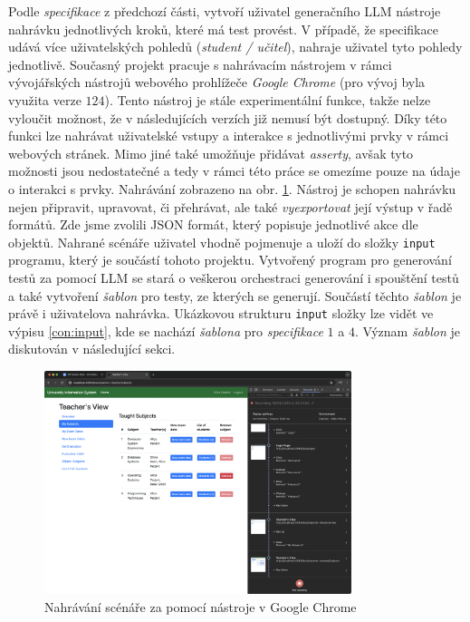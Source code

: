 \documentclass[czech, ma, kiv, he, iso690numb, pdf, viewonly]{fasthesis}
\begin{document}
    Podle \emph{specifikace} z předchozí části, vytvoří uživatel generačního LLM nástroje nahrávku jednotlivých kroků, které má test provést. V případě, že specifikace udává více uživatelských pohledů (\textit{student / učitel}), nahraje uživatel tyto pohledy jednotlivě. Současný projekt pracuje s nahrávacím nástrojem v rámci vývojářských nástrojů webového prohlížeče \textit{Google Chrome} (pro vývoj byla využita verze \(124\)). Tento nástroj je stále experimentální funkce, takže nelze vyloučit možnost, že v následujících verzích již nemusí být dostupný. Díky této funkci lze nahrávat uživatelské vstupy a interakce s jednotlivými prvky v rámci webových stránek. Mimo jiné také umožňuje přidávat \textit{asserty}, avšak tyto možnosti jsou nedostatečné a tedy v rámci této práce se omezíme pouze na údaje o interakci s prvky. Nahrávání zobrazeno na obr. \ref{fig:chrome_recording}. Nástroj je schopen nahrávku nejen připravit, upravovat, či přehrávat, ale také \emph{vyexportovat} její výstup v řadě formátů. Zde jsme zvolili JSON formát, který popisuje jednotlivé akce dle objektů. Nahrané scénáře uživatel vhodně pojmenuje a uloží do složky \verb|input| programu, který je součástí tohoto projektu. Vytvořený program pro generování testů za pomocí LLM se stará o veškerou orchestraci generování i spouštění testů a také vytvoření \emph{šablon} pro testy, ze kterých se generují. Součástí těchto \emph{šablon} je právě i uživatelova nahrávka. Ukázkovou strukturu \verb|input| složky lze vidět ve výpisu \ref{con:input}, kde se nachází \emph{šablona} pro \textit{specifikace} \(1\) a \(4\). Význam \emph{šablon} je diskutován v následující sekci.

    \begin{figure}
        \includegraphics[width=0.8\textwidth]{pic/recording.png}
        \centering
        \caption{Nahrávání scénáře za pomocí nástroje v Google Chrome}
        \label{fig:chrome_recording}
    \end{figure}
\end{document}
